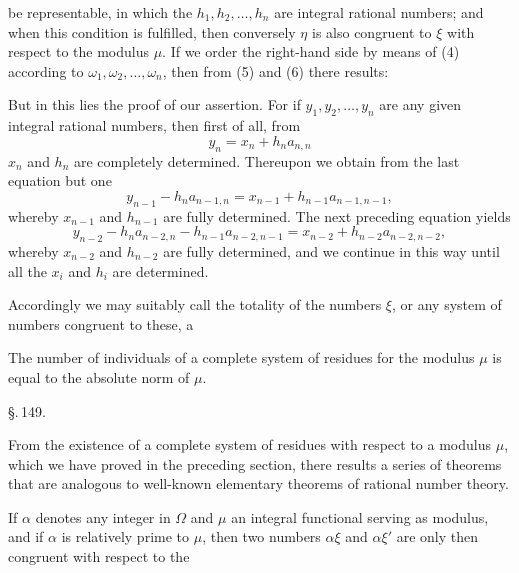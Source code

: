 be representable, in which the $h_1, h_2, \ldots, h_n$ are integral
rational numbers; and when this condition is fulfilled, then conversely
$\eta$ is also congruent to $\xi$ with respect to the modulus $\mu$. If
we order the right-hand side by means of (4) according to $\omega_1,
\omega_2, \ldots, \omega_n$, then from (5) and (6) there results:

But in this lies the proof of our assertion. For if $y_1, y_2,
\ldots, y_n$ are any given integral rational numbers, then first of
all, from
\[
y_n = x_n + h_na_{n,n}
\]
$x_n$ and $h_n$ are completely determined. Thereupon we obtain from
the last equation but one
\[
y_{n-1} - h_na_{n-1,n} = x_{n-1} + h_{n-1}a_{n-1,n-1},
\]
whereby $x_{n-1}$ and $h_{n-1}$ are fully determined. The next
preceding equation yields
\[
y_{n-2} - h_na_{n-2,n} - h_{n-1}a_{n-2,n-1} = x_{n-2} + h_{n-2}a_{n-2,n-2},
\]
whereby $x_{n-2}$ and $h_{n-2}$ are fully determined, and we continue
in this way until all the $x_i$ and $h_i$ are determined.

Accordingly we may suitably call the totality of the numbers $\xi$, or
any system of numbers congruent to these, a 

The number of individuals of a complete system of residues for the
modulus $\mu$ is equal to the absolute norm of $\mu$.

\begin{center}
\S.\,149.

\end{center}

From the existence of a complete system of residues with respect to a
modulus $\mu$, which we have proved in the preceding section, there
results a series of theorems that are analogous to well-known
elementary theorems of rational number theory.

If $\alpha$ denotes any integer in $\Omega$ and $\mu$ an integral
functional serving as modulus, and if $\alpha$ is relatively prime to
$\mu$, then two numbers $\alpha\xi$ and $\alpha\xi'$ are only then
congruent with respect to the
